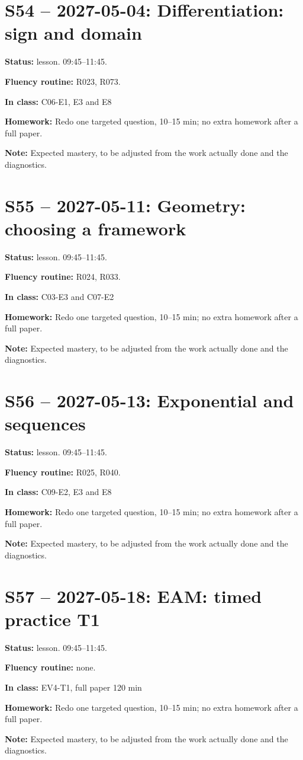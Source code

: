 \section*{S54 -- 2027-05-04: Differentiation: sign and domain}
\textbf{Status:} lesson. 09:45–11:45.\par\textbf{Fluency routine:} R023, R073.\par\textbf{In class:} C06-E1, E3 and E8\par\textbf{Homework:} Redo one targeted question, 10–15 min; no extra homework after a full paper.\par\textbf{Note:} Expected mastery, to be adjusted from the work actually done and the diagnostics.
\section*{S55 -- 2027-05-11: Geometry: choosing a framework}
\textbf{Status:} lesson. 09:45–11:45.\par\textbf{Fluency routine:} R024, R033.\par\textbf{In class:} C03-E3 and C07-E2\par\textbf{Homework:} Redo one targeted question, 10–15 min; no extra homework after a full paper.\par\textbf{Note:} Expected mastery, to be adjusted from the work actually done and the diagnostics.
\section*{S56 -- 2027-05-13: Exponential and sequences}
\textbf{Status:} lesson. 09:45–11:45.\par\textbf{Fluency routine:} R025, R040.\par\textbf{In class:} C09-E2, E3 and E8\par\textbf{Homework:} Redo one targeted question, 10–15 min; no extra homework after a full paper.\par\textbf{Note:} Expected mastery, to be adjusted from the work actually done and the diagnostics.
\section*{S57 -- 2027-05-18: EAM: timed practice T1}
\textbf{Status:} lesson. 09:45–11:45.\par\textbf{Fluency routine:} none.\par\textbf{In class:} EV4-T1, full paper 120 min\par\textbf{Homework:} Redo one targeted question, 10–15 min; no extra homework after a full paper.\par\textbf{Note:} Expected mastery, to be adjusted from the work actually done and the diagnostics.
